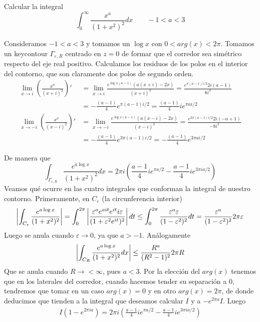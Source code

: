 \documentclass[twoside]{article}
\begin{document}
\begin{ejercicio}{3}
Calcular la integral
$$
\int_0^\infty \frac{x^a}{(1+x^2)^2}dx \qquad -1<a<3
$$
\end{ejercicio}
\begin{solucion}
Consideramos $-1<a<3$ y tomamos un $\log x$ con $0<arg(x)<2\pi$.  Tomamos un keycontour $\Gamma_{\varepsilon,R}$ centrado en $z=0$ de formar que el corredor sea simétrico respecto del eje  real positivo. Calculamos los residuos de los polos en el interior del contorno, que son claramente dos polos de segundo orden.
\begin{align*}
\lim_{x\to i} \left(\frac{x^a}{(x+i)^2}\right)' &= \lim_{x\to i}\frac{e^{\log{x}(a-1)}(a(x+i)-2x)}{(x+i)^3} = \frac{e^{\pi (a-1)i/2}2i(a-1)}{8i^3}\\ 
&=-\frac{(a-1)}{4}e^{\pi (a-1)i/2} =\frac{(a-1)}{4}ie^{\pi ai/2} \\
\lim_{x\to -i} \left(\frac{x^a}{(x-i)^2}\right)' &= \lim_{x\to -i}\frac{e^{\log{x}(a-1)}(a(x-i)-2x)}{(x-i)^3} =\frac{e^{3\pi (a-1)i/2}2i(-a+1)}{-8i^3}\\ 
&=-\frac{(a-1)}{4}e^{3\pi (a-1)i/2} = -\frac{(a-1)}{4}e^{3\pi ai/2}
\end{align*}

De manera que
$$
\int_{\Gamma_{\varepsilon,R}} \frac{e^{a \log x}}{(1+x^2)^2}dx = 2\pi i\left( \frac{a-1}{4}ie^{\pi a/2}-\frac{a-1}{4}ie^{3\pi i a /2}\right)
$$
Veamos qué ocurre en las cuatro integrales que conforman la integral de nuestro contorno. Primeramente, en $C_\varepsilon$ (la circunferencia interior)
$$
\left\lvert\int_{C_\varepsilon}\frac{e^{a \log x}}{(1+x^2)^2} \right\rvert=\int_0^{2\pi} \left\lvert\frac{\varepsilon^a e^{ait} e^{it} i \varepsilon}{(1+\varepsilon^2e^{it})^2}\right\rvert dt\leq \int_0^{2\pi}\frac{\varepsilon^a\varepsilon}{(1-\varepsilon^2)^2}dt = \frac{\varepsilon^a}{(1-\varepsilon^2)^2}2\pi \varepsilon 
$$ 
Luego se anula cuando $\varepsilon \to 0$, ya que $a>-1$. Análogamente
$$
\left\lvert\int_{C_R} \frac{e^{a \log x}}{(1+x^2)^2} dx \right\rvert \leq  \frac{R^a}{(R^2-1)^2}2\pi R
$$
Que se anula cuando $R\to<\infty$, pues $a<3$. Por la elección del $arg(x)$ tenemos que en los laterales del corredor, cuando hacemos tender su separación a $0$, tendremos que tomar en un caso $arg(x)=0$ y en otro $arg(x)=2\pi$, de donde deducimos que tienden a la integral que deseamos calcular $I$ y a $-e^{2\pi a}I$. Luego
\begin{align*}
I(1-e^{2\pi i a}) = 2\pi i\left( \frac{a-1}{4}ie^{\pi a/2}-\frac{a-1}{4}ie^{3\pi i a /2}\right)
\end{align*}
\end{solucion}
\newpage
\end{document}
